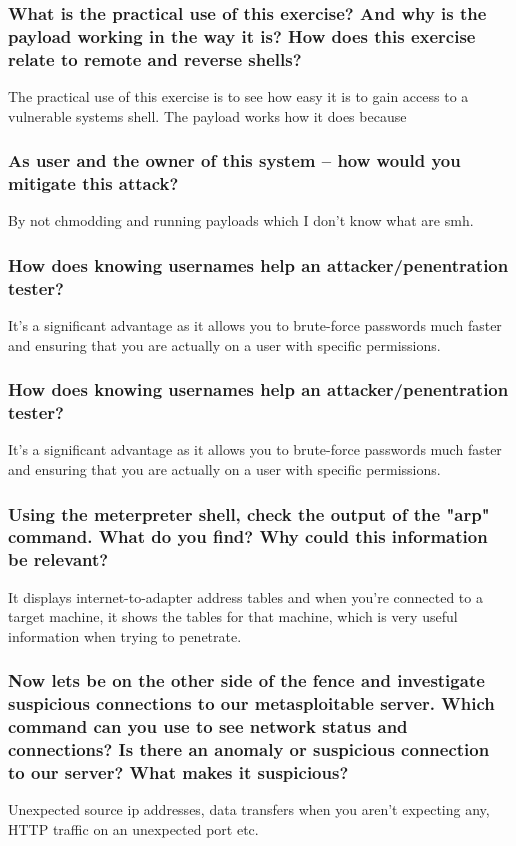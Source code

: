 \subsubsection{What is the practical use of this exercise? And why is the payload working in the way it is? How does this exercise relate to remote and reverse shells?}
The practical use of this exercise is to see how easy it is to gain access to a vulnerable systems shell. The payload works how it does because

\subsubsection{As user and the owner of this system -- how would you mitigate this attack?}
By not chmodding and running payloads which I don't know what are smh.

\subsubsection{How does knowing usernames help an attacker/penentration tester?
}
It's a significant advantage as it allows you to brute-force passwords much faster and ensuring that you are actually on a user with specific permissions.

\subsubsection{How does knowing usernames help an attacker/penentration tester?}
It's a significant advantage as it allows you to brute-force passwords much faster and ensuring that you are actually on a user with specific permissions.

\subsubsection{Using the meterpreter shell, check the output of the "arp" command. What do you find? Why could this information be relevant?
}
It displays internet-to-adapter address tables and when you're connected to a target machine, it shows the tables for that machine, which is very useful information when trying to penetrate.

\subsubsection{Now lets be on the other side of the fence and investigate suspicious connections to our metasploitable server. Which command can you use to see network status and connections? Is there an anomaly or suspicious connection to our server? What makes it suspicious?}
Unexpected source ip addresses, data transfers when you aren't expecting any, HTTP traffic on an unexpected port etc.